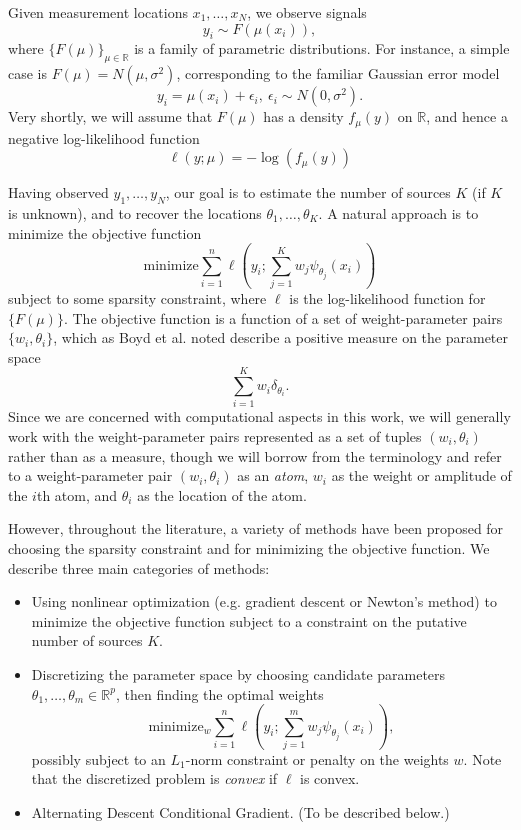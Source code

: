 \documentclass[11pt]{article}
\begin{document}
Given measurement locations $x_1,\hdots, x_N$, we observe signals
\[
y_i \sim F(\mu(x_i)),
\]
where $\{F(\mu)\}_{\mu \in \mathbb{R}}$ is a family of parametric distributions.
For instance, a simple case is $F(\mu) = N(\mu, \sigma^2)$, corresponding to the familiar Gaussian error model
\[
y_i = \mu(x_i) + \epsilon_i, \ \epsilon_i \sim N(0, \sigma^2).
\]
Very shortly, we will assume that $F(\mu)$ has a density $f_\mu(y)$ on $\mathbb{R}$,
and hence a negative log-likelihood function
\[
\ell(y; \mu) = -\log(f_\mu(y))
\]

Having observed $y_1,\hdots, y_N$, our goal is to estimate the number
of sources $K$ (if $K$ is unknown), and to recover the locations
$\theta_1,\hdots, \theta_K$.
A natural approach is to minimize the objective function
\[
\text{minimize} \sum_{i=1}^n \ell\left(y_i; \sum_{j=1}^K w_j \psi_{\theta_j}(x_i) \right)
\]
subject to some sparsity constraint, where $\ell$ is the
log-likelihood function for $\{F(\mu)\}$.  
The objective function is a function of a set of weight-parameter pairs $\{w_i, \theta_i\}$,
which as Boyd et al. noted describe a positive measure on the parameter space
\[
\sum_{i=1}^K w_i \delta_{\theta_i}.
\]
Since we are concerned with computational aspects in this work, we
will generally work with the weight-parameter pairs represented as a
set of tuples $(w_i,\theta_i)$ rather than as a measure, though we
will borrow from the terminology and refer to a weight-parameter pair
$(w_i,\theta_i)$ as an \emph{atom}, $w_i$ as the weight or amplitude
of the $i$th atom, and $\theta_i$ as the location of the atom.

However, throughout the literature, a variety of methods have been
proposed for choosing the sparsity constraint and for minimizing the
objective function.  We describe three main categories of methods:
\begin{itemize}
\item Using nonlinear optimization (e.g. gradient descent or Newton's
  method) to minimize the objective function subject to a constraint
  on the putative number of sources $K$.
\item Discretizing the parameter space by choosing candidate
  parameters $\theta_1,\hdots, \theta_m \in \mathbb{R}^p$, then finding the optimal weights
\[
\text{minimize}_w \sum_{i=1}^n \ell\left(y_i; \sum_{j=1}^m w_j \psi_{\theta_j}(x_i) \right),
\]
possibly subject to an $L_1$-norm constraint or penalty on the weights $w$.
Note that the discretized problem is \emph{convex} if $\ell$ is convex.
\item Alternating Descent Conditional Gradient.  (To be described below.)
\end{itemize}
\end{document}
